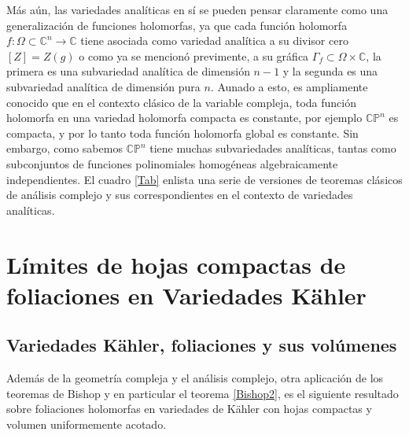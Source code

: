 \documentclass{article}
\newcommand{\co}{\ensuremath{\mathbb C }}
\newcommand{\con}{\ensuremath{\mathbb{C}^n}}
\newcommand{\cp}{\ensuremath{\mathbb{CP}}}
\begin{document}
M\'as a\'un, las variedades anal\'iticas en s\'i se pueden pensar claramente como una generalizaci\'on de funciones holomorfas, 
ya que cada funci\'on holomorfa $f:\Omega\subset\con\rightarrow\co$ tiene asociada como variedad anal\'itica a su divisor cero $[Z]=Z(g)$
o como ya se mencion\'o previmente, a su gr\'afica $\Gamma_{f}\subset\Omega\times\co$, la primera es una subvariedad anal\'itica de
dimensi\'on $n-1$ y la segunda es
una subvariedad anal\'itica de dimensi\'on pura $n$. Aunado a esto, es ampliamente conocido que en el contexto cl\'asico
de la variable compleja, toda funci\'on holomorfa en una variedad holomorfa compacta es constante, por ejemplo $\cp^n$ es compacta,
y por lo tanto toda funci\'on holomorfa global es constante. Sin embargo, como sabemos $\cp^n$ tiene muchas subvariedades anal\'iticas, tantas
como subconjuntos de funciones polinomiales homog\'eneas algebraicamente independientes. El cuadro \ref{Tab} enlista una serie de
versiones de teoremas cl\'asicos de an\'alisis complejo y sus correspondientes en el contexto de variedades anal\'iticas.

\section{L\'imites de hojas compactas de foliaciones en Variedades K\"ahler}
\subsection{Variedades K\"ahler, foliaciones y sus vol\'umenes}
\noindent Adem\'as de la geometr\'ia compleja y el an\'alisis complejo, otra aplicaci\'on de los teoremas de Bishop y en particular el teorema
\ref{Bishop2}, es el siguiente resultado sobre foliaciones holomorfas en variedades de K\"ahler con hojas compactas y volumen 
uniformemente acotado. 
\end{document}
